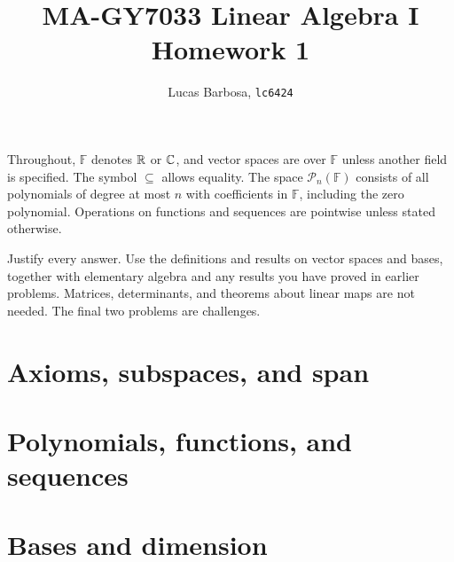\documentclass[nohyper,nobib,nofonts]{tufte-handout}
\title[MA-GY7033 Linear Algebra I, Homework 1]{MA-GY7033 Linear Algebra I\\Homework 1}
\author[Lucas Barbosa, lc6424]{Lucas Barbosa, \texttt{lc6424}}
\date{}
\theoremstyle{definition}
\begin{document}
\maketitle

Throughout, \(\mathbb F\) denotes \(\mathbb{R}\) or \(\mathbb{C}\), and vector spaces
are over \(\mathbb F\) unless another field is specified. The symbol
\(\subseteq\) allows equality. The space \(\mathcal P_n(\mathbb F)\)
consists of all polynomials of degree at most \(n\) with coefficients in
\(\mathbb F\), including the zero polynomial. Operations on functions
and sequences are pointwise unless stated otherwise.

Justify every answer. Use the definitions and results on vector spaces and
bases, together with elementary algebra and any results you have proved in
earlier problems. Matrices, determinants, and theorems about linear maps
are not needed. The final two problems are challenges.

\section*{Axioms, subspaces, and span}















\section*{Polynomials, functions, and sequences}






\section*{Bases and dimension}








\end{document}
